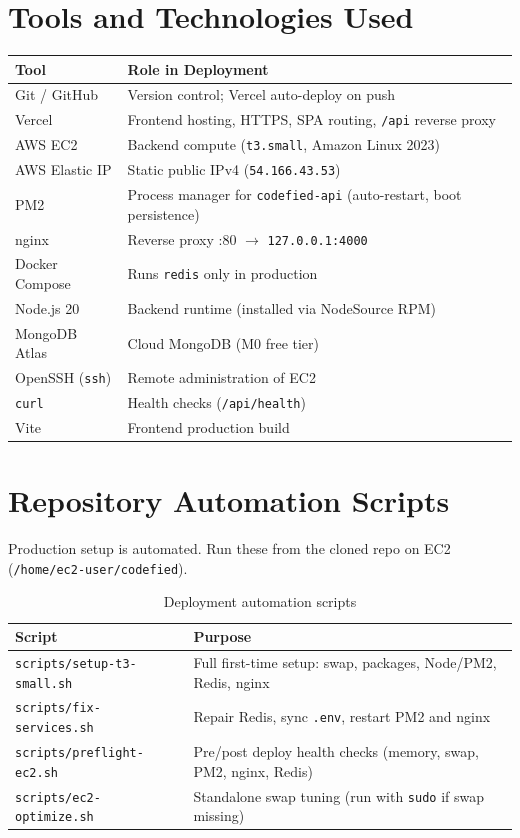 \documentclass[11pt,a4paper]{article}
\newcommand{\productionip}{\texttt{54.166.43.53}}
\begin{document}
\section{Tools and Technologies Used}

\begin{table}[h]
\centering
\begin{tabular}{@{}lp{9.5cm}@{}}
\toprule
\textbf{Tool} & \textbf{Role in Deployment} \\
\midrule
Git / GitHub       & Version control; Vercel auto-deploy on push \\
Vercel             & Frontend hosting, HTTPS, SPA routing, \texttt{/api} reverse proxy \\
AWS EC2            & Backend compute (\texttt{t3.small}, Amazon Linux 2023) \\
AWS Elastic IP     & Static public IPv4 (\productionip) \\
PM2                & Process manager for \texttt{codefied-api} (auto-restart, boot persistence) \\
nginx              & Reverse proxy :80 $\rightarrow$ \texttt{127.0.0.1:4000} \\
Docker Compose     & Runs \texttt{redis} only in production \\
Node.js 20         & Backend runtime (installed via NodeSource RPM) \\
MongoDB Atlas      & Cloud MongoDB (M0 free tier) \\
OpenSSH (\texttt{ssh}) & Remote administration of EC2 \\
\texttt{curl}      & Health checks (\texttt{/api/health}) \\
Vite               & Frontend production build \\
\bottomrule
\end{tabular}
\end{table}

\section{Repository Automation Scripts}

Production setup is automated. Run these from the cloned repo on EC2 (\texttt{/home/ec2-user/codefied}).

\begin{table}[h]
\centering
\begin{tabular}{@{}lp{8.5cm}@{}}
\toprule
\textbf{Script} & \textbf{Purpose} \\
\midrule
\texttt{scripts/setup-t3-small.sh}   & Full first-time setup: swap, packages, Node/PM2, Redis, nginx \\
\texttt{scripts/fix-services.sh}     & Repair Redis, sync \texttt{.env}, restart PM2 and nginx \\
\texttt{scripts/preflight-ec2.sh}    & Pre/post deploy health checks (memory, swap, PM2, nginx, Redis) \\
\texttt{scripts/ec2-optimize.sh}     & Standalone swap tuning (run with \texttt{sudo} if swap missing) \\
\bottomrule
\end{tabular}
\caption{Deployment automation scripts}
\end{table}
\end{document}
